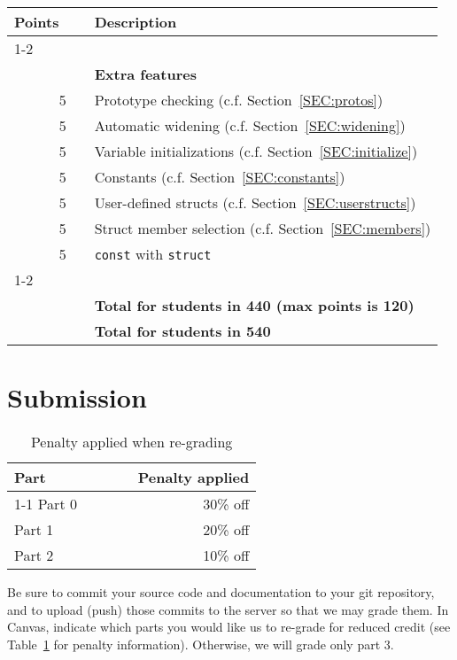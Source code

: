 \documentclass{article}
\makeatletter
\newcommand{\gradeline}{ \cline{1-2} \cline{4-4} ~\\[-1.5ex] }
\newenvironment{gradetable}{\begin{longtable}{@{}rrcp{5in}} \multicolumn{2}{l}{\bf Points} & & {\bf Description}\\ \gradeline}{\end{longtable}}
\newcommand{\mainitem}[2]{\pagebreak[2] {\bf #1} &&& {\bf #2}}
\newcommand{\inneritem}[2]{~ & #1 && #2}
\newcommand{\parser}{2}
\newcommand{\typecheck}{3}
\makeatother
\begin{document}
\begin{gradetable}
  \mainitem{35}{Extra features}
  \\[1mm]
  \inneritem{5}{Prototype checking (c.f. Section~\ref{SEC:protos})}
  \\[1mm]
  \inneritem{5}{Automatic widening (c.f. Section~\ref{SEC:widening})}
  \\[1mm]
  \inneritem{5}{Variable initializations (c.f. Section~\ref{SEC:initialize})}
  \\[1mm]
  \inneritem{5}{Constants (c.f. Section~\ref{SEC:constants})}
  \\[1mm]
  \inneritem{5}{User-defined structs (c.f. Section~\ref{SEC:userstructs})}
  \\[1mm]
  \inneritem{5}{Struct member selection (c.f. Section~\ref{SEC:members})}
  \\[1mm]
  \inneritem{5}{{\tt const} with {\tt struct}}
  \\[4mm]

  \gradeline
  \mainitem{100}{Total for students in 440 (max points is 120)}
  \\
  \mainitem{115}{Total for students in 540}
\end{gradetable}


\section{Submission}

\begin{table}[h]
\centering

  \begin{tabular}{lcr}
    {\bf Part} & ~~~~ & {\bf Penalty applied} \\ \cline{1-1}\cline{3-3}
    Part 0 && 30\% off \\
    Part 1 && 20\% off \\
    Part \parser && 10\% off
  \end{tabular}

\caption{Penalty applied when re-grading}
\label{TAB:penalties}
\end{table}

Be sure to commit your source code and documentation to your
git repository, and to upload (push) those commits to the server
so that we may grade them.
In Canvas,
indicate which parts you would like us to re-grade for reduced credit
(see Table~\ref{TAB:penalties} for penalty information).
Otherwise, we will grade only part \typecheck.
\end{document}
